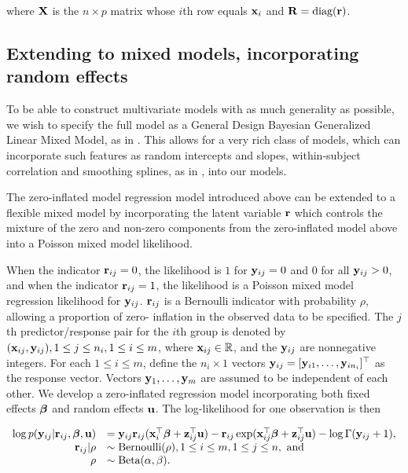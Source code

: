 \noindent where ${\bf X}$ is the $n\times p$ matrix whose $i$th row equals ${\bf x}_i$
and ${\bf R} = \text{diag}{({\bf r})}$.

\subsection{Extending to mixed models, incorporating random effects}

To be able to construct multivariate models with as much generality as
possible, we wish to specify the full model as a General Design Bayesian
Generalized Linear Mixed Model, as in \cite{Zhao2006}. This allows for a very
rich class of models, which can incorporate such features as random intercepts
and slopes, within-subject correlation and smoothing splines, as in
\cite{Wand2008}, into our models.

The zero-inflated model regression model introduced above can be extended to a
flexible mixed model by incorporating the latent variable ${\bf r}$ which controls
the mixture of the zero and non-zero components from the zero-inflated model
above into a Poisson mixed model likelihood.

When the indicator ${\bf r}_{ij} = 0$, the likelihood is $1$ for ${\bf y}_{ij} = 0$ and
$0$ for all ${\bf y}_{ij} > 0$, and when the indicator ${\bf r}_{ij} = 1$, the
likelihood is a Poisson mixed model regression likelihood for ${\bf y}_{ij}$.
${\bf r}_{ij}$ is a Bernoulli indicator with probability $\rho$, allowing a
proportion of zero- inflation in the observed data to be specified. The $j$th
predictor/response pair for the $i$th group is denoted by $({\bf x}_{ij},
{\bf y}_{ij}), 1 \leq j \leq n_i, 1 \leq i \leq m$, where ${\bf x}_{ij} \in {\mathbb{R}}$, and
the ${\bf y}_{ij}$ are nonnegative integers. For each $1 \leq i \leq m$, define the
$n_i \times 1$ vectors ${\bf y}_{ij} = [{\bf y}_{i 1}, \ldots, {\bf y}_{i n_i}]^\top$ as
the response vector. Vectors ${\bf y}_1, \ldots, {\bf y}_m$ are assumed to be
independent of each other.  We develop a zero-inflated regression model
incorporating both fixed effects ${\boldsymbol \beta}$ and random effects ${\bf u}$. The
log-likelihood for one observation is then

$$
	\begin{array}{rl}
		\log p({\bf y}_{ij} | {\bf r}_{ij}, {\boldsymbol \beta}, {\bf u}) & = {\bf y}_{ij} {\bf r}_{ij} ({\bf x}_i^\top {\boldsymbol\beta} + {\bf z}_{ij}^\top {\bf u}) - {\bf r}_{ij} \exp ({\bf x}_{ij}^\top {\boldsymbol\beta} + {\bf z}_{ij}^\top {\bf u}) - \log \Gamma ({\bf y}_{ij} + 1), \\
		{\bf r}_{ij} | \rho                  & \sim \text{Bernoulli}(\rho), 1 \leq i \leq m, 1 \leq j \leq n, \text{ and }                                                              \\
		\rho                        & \sim \text{Beta}(\alpha, \beta).                                                                                              \\
	\end{array}
$$

